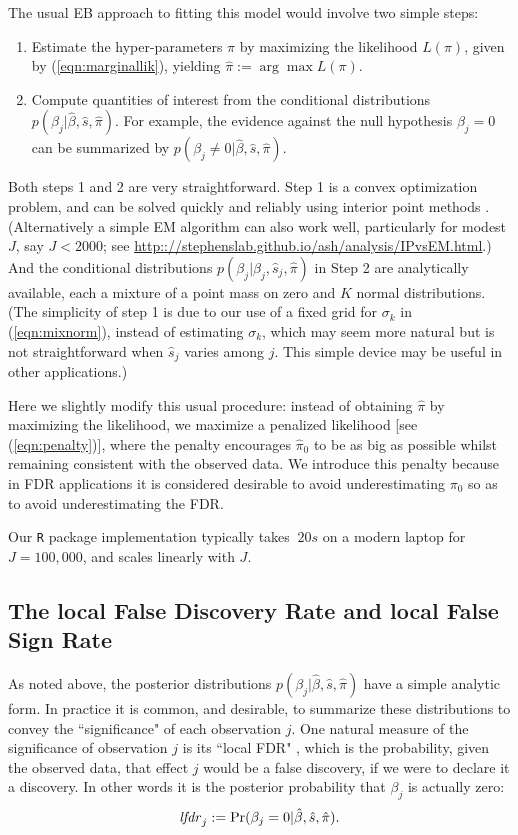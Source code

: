 \documentclass[11pt]{article}
\def\bhat{\hat{\beta}}
\def\shat{\hat{s}}
\begin{document}
The usual EB approach to fitting this model would involve two simple steps:
\begin{enumerate}
\item Estimate the hyper-parameters $\pi$ by maximizing the likelihood $L(\pi)$, given by (\ref{eqn:marginallik}), yielding $\hat{\pi} := \arg \max L(\pi)$.
\item Compute quantities of interest from the conditional distributions $p(\beta_j | \bhat, \shat, \hat{\pi})$. For example, the evidence
against the null hypothesis $\beta_j=0$ can be summarized by $p(\beta_j \neq 0 | \bhat, \shat,\hat{\pi})$.
\end{enumerate}
Both steps 1 and 2 are very straightforward. Step 1 is a convex optimization problem, and can be solved quickly and reliably using interior point methods \cite{boyd2004convex,koenker2013convex}. (Alternatively a simple EM algorithm can also work well, particularly for modest $J$, say $J<2000$;
see \url{http:://stephenslab.github.io/ash/analysis/IPvsEM.html}.) 
And the conditional distributions $p(\beta_j | \bhat_j, \shat_j,\hat{\pi})$ in Step 2 are analytically available, each a mixture of a point mass on zero and $K$ normal distributions.
(The simplicity of step 1 is due to our use of a fixed grid for $\sigma_k$ in (\ref{eqn:mixnorm}), instead of estimating $\sigma_k$,
which may seem more natural but is not straightforward when $\shat_j$ varies among $j$. This simple device may be useful in other applications.)

Here we slightly modify this usual procedure: instead of obtaining $\hat\pi$ by maximizing the likelihood, we maximize a penalized
likelihood [see (\ref{eqn:penalty})], where the penalty encourages $\hat\pi_0$ to be as big as possible whilst remaining consistent with the observed data. 
We introduce this penalty because in FDR applications it is considered desirable to avoid underestimating $\pi_0$ so as to avoid underestimating the FDR. 

Our {\tt R} package implementation typically takes $~20s$ on a modern laptop for $J=100,000$, and scales linearly with $J$. 


\subsection*{The local False Discovery Rate and local False Sign Rate}

As noted above, the posterior distributions $p(\beta_j | \bhat, \shat, \hat{\pi})$ have a simple analytic form.
In practice it is common, and desirable, to summarize these distributions to convey the ``significance" of each observation $j$.
One natural measure of the significance of observation $j$ is its ``local FDR" \cite{efron2008microarrays}, which is
the probability, given the observed data, that effect $j$ would be a false discovery, if we were to declare it a discovery.
In other words it is the posterior probability that $\beta_j$ is actually zero:
\begin{equation} \label{eqn:fdr}
\fdr_j := \Pr(\beta_j =0  |  \bhat, \shat, \hat{\pi}).
\end{equation}
\end{document}

